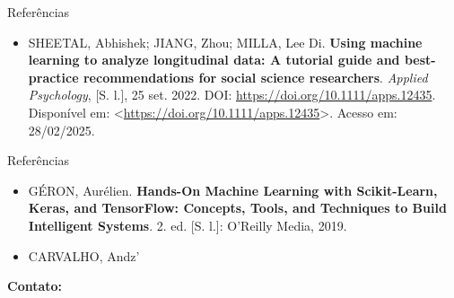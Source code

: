 \documentclass{libs/ufc_format}
\begin{document}
\begin{frame}{Referências}
    \begin{itemize}
	   	\justifying
		\item SHEETAL, Abhishek; JIANG, Zhou; MILLA, Lee Di. \textbf{Using machine learning to analyze longitudinal data: A tutorial guide and best-practice recommendations for social science researchers}. \textit{Applied Psychology}, [S. l.], 25 set. 2022. DOI: \url{https://doi.org/10.1111/apps.12435}. Disponível em: <\url{https://doi.org/10.1111/apps.12435}>. Acesso em: 28/02/2025.
\end{itemize}
\end{frame}

\begin{frame}{Referências}
	\begin{itemize}
		\justifying
        \item GÉRON, Aurélien. \textbf{Hands-On Machine Learning with Scikit-Learn, Keras, and TensorFlow: Concepts, Tools, and Techniques to Build Intelligent Systems}. 2. ed. [S. l.]: O'Reilly Media, 2019.
        \item CARVALHO, Andz'
	\end{itemize}
\end{frame}



\begin{frame}{}
    \centering
    \huge{\textbf{}}
    
    \vspace{1cm}
    
    \Large{\textbf{Contato:}}
    \newline
    \vspace*{0.5cm}
    \large{}
\end{frame}
\end{document}
